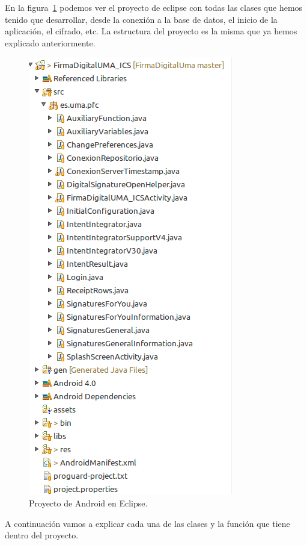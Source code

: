 En la figura~\ref{fig:proyectoAndroid} podemos ver el proyecto de eclipse con todas las clases que hemos tenido que desarrollar, desde la conexión a la base de datos, el inicio de la aplicación, el cifrado, etc. La estructura del proyecto es la misma que ya hemos explicado anteriormente.

\begin{figure}
  \centering
    \includegraphics[scale=0.7]{./Android/imagenes/proyectoAndroid.png}
  \caption{Proyecto de Android en Eclipse.}
  \label{fig:proyectoAndroid}
\end{figure}

A continuación vamos a explicar cada una de las clases y la función que tiene dentro del proyecto.

